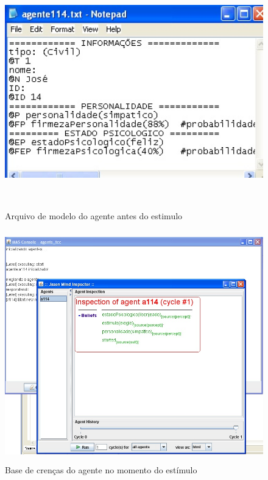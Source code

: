 \begin{figure}
\centering
\includegraphics [height=10cm]{figuras/jose_antes.jpg}
\caption{Arquivo de modelo do agente antes do estimulo}
\label{ze_antes}
\end{figure}

\begin{figure}
\centering
\includegraphics [height=10cm]{figuras/base_crencas_jose.jpg}
\caption{Base de crenças do agente no momento do estímulo}
\label{base_crencas}
\end{figure}

